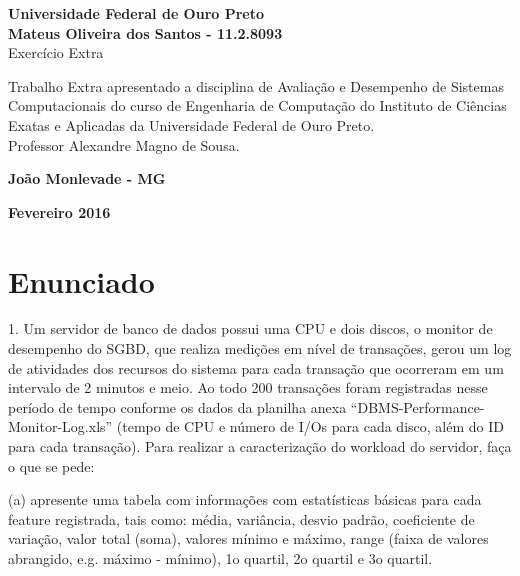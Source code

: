 \documentclass[11pt,a4paper,openany,oneside]{abntex2}
\begin{document}
	\begin{titlepage}
		\vfill
		\begin{center}
			{\large \textbf{Universidade Federal de Ouro Preto}} \\[2.5cm]
			
			  
			{\large \textbf{Mateus Oliveira dos Santos - 11.2.8093}}\\[4cm]
			
			
			{\Large Exercício Extra}\\[4cm]
			
			\hspace{.45\textwidth} %
			\begin{minipage}{.5\textwidth}
				\large Trabalho Extra apresentado a disciplina de Avaliação e Desempenho de Sistemas Computacionais do curso de Engenharia de Computação do  Instituto de Ciências Exatas e Aplicadas da  Universidade  Federal de Ouro Preto.\\[1cm]
				Professor Alexandre Magno de Sousa.
			\end{minipage}
			\vfill
			
			\vspace{2cm}
			
			\large \textbf{João Monlevade - MG}
			
			\large \textbf{Fevereiro 2016}
		\end{center}
	\end{titlepage}	
	
	
	
\chapter{Enunciado}
\label{enunciado}
	
	1. Um servidor de banco de dados possui uma CPU e dois discos, o monitor de desempenho do SGBD, que realiza medições em nível de transações, gerou um log de atividades dos recursos do sistema para cada transação que ocorreram em um intervalo de 2 minutos e meio. Ao todo 200 transações foram registradas nesse período de tempo conforme os dados da planilha anexa “DBMS-Performance-Monitor-Log.xls” (tempo de CPU e número de I/Os para cada disco, além do ID para cada transação). Para realizar a caracterização do workload do servidor, faça o que se pede:
	
	(a) apresente uma tabela com informações com estatísticas básicas para cada feature registrada, tais como: média, variância, desvio padrão, coeficiente de variação, valor total (soma), valores mínimo e máximo, range (faixa de valores abrangido, e.g. máximo - mínimo), 1o quartil, 2o quartil e 3o quartil.
	
\end{document}
